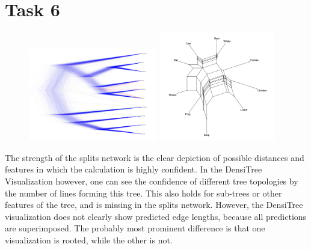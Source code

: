 \documentclass[10pt,a4paper]{article}
\begin{document}
	\section*{Task 6}
		\begin{figure}[h]
			\includegraphics[width = 0.5\textwidth]{densi.png}%
			\hfill
			\includegraphics[width = 0.45\textwidth]{tree5.png}
		\end{figure}
		\noindent The strength of the splits network is the clear depiction of possible distances and features in which the calculation is highly confident. In the DensiTree Visualization however, one can see the confidence of different tree topologies by the number of lines forming this tree. This also holds for sub-trees or other features of the tree, and is missing in the splits network. However, the DensiTree visualization does not clearly show predicted edge lengths, because all predictions are superimposed. The probably most prominent difference is that one visualization is rooted, while the other is not. 				
\end{document}
